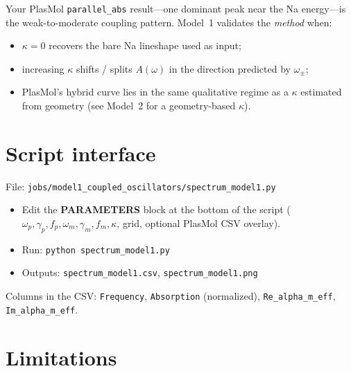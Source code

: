 \documentclass[11pt,a4paper]{article}
\begin{document}
\noindent
Your PlasMol \texttt{parallel\_abs} result---one dominant peak near the
Na energy---is the weak-to-moderate coupling pattern.  Model~1 validates
the \emph{method} when:
\begin{itemize}[leftmargin=1.4em]
  \item $\kappa=0$ recovers the bare Na lineshape used as input;
  \item increasing $\kappa$ shifts / splits $A(\omega)$ in the direction
        predicted by $\omega_\pm$;
  \item PlasMol's hybrid curve lies in the same qualitative regime as a
        $\kappa$ estimated from geometry (see Model~2 for a
        geometry-based $\kappa$).
\end{itemize}

\section{Script interface}

File: \texttt{jobs/model1\_coupled\_oscillators/spectrum\_model1.py}

\begin{itemize}[leftmargin=1.4em]
  \item Edit the \textbf{PARAMETERS} block at the bottom of the script
        ($\omega_p,\gamma_p,f_p,\omega_m,\gamma_m,f_m,\kappa$, grid,
        optional PlasMol CSV overlay).
  \item Run: \texttt{python spectrum\_model1.py}
  \item Outputs: \texttt{spectrum\_model1.csv}, \texttt{spectrum\_model1.png}
\end{itemize}

\noindent
Columns in the CSV:
\texttt{Frequency}, \texttt{Absorption} (normalized),
\texttt{Re\_alpha\_m\_eff}, \texttt{Im\_alpha\_m\_eff}.

\section{Limitations}
\end{document}
